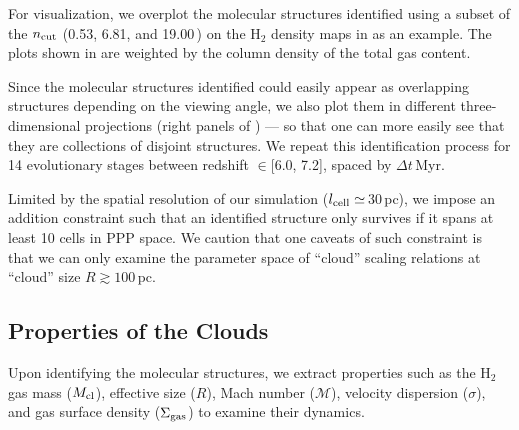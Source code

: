 \IfFileExists{emulateapjlegacy.cls}{\documentclass[iop]{emulateapjlegacy}}{\documentclass[iop]{emulateapj}}
\begin{document}
For visualization, we overplot the molecular structures identified using a subset of the $n_{\rm cut}$ (0.53, 6.81, and 19.00\,\cc) on the H$_2$ density maps in  as an example. The plots shown in  are weighted by the column density of the total gas content.

Since the molecular structures identified could easily appear as overlapping structures depending on the viewing angle, we also plot them in different three-dimensional projections (right panels of ) --- so that one can more easily see that they are collections of disjoint structures.
%
We repeat this identification process for 14 evolutionary stages between redshift \z$\in$[6.0, 7.2], spaced by $\Delta t$\,Myr.

Limited by the spatial resolution of our simulation ($l_{\rm cell}\simeq$\,30\,pc), we impose an addition constraint such that an identified structure only survives if it spans at least 10 cells in PPP space. We caution that one caveats of such constraint is that we can only examine the parameter space of ``cloud'' scaling relations at ``cloud'' size $R\gtrsim100$\,pc.

\subsection{Properties of the Clouds}

Upon identifying the molecular structures, we extract properties such as the H$_2$ gas mass ($M_{\rm cl}$), effective size ($R$), Mach number ($\mathcal{M}$), velocity dispersion ($\sigma$), and gas surface density ($\Sigma_{\rm gas}$) to examine their dynamics.
\end{document}
